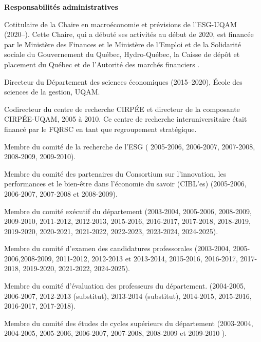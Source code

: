\centerline{\bf Responsabilit\'es administratives}
\begin{description}

\vspace{.3 cm}

\item Cotitulaire de la Chaire en macro\'economie et pr\'evisions de l'ESG-UQAM (2020--). Cette Chaire, qui a d\'ebut\'e ses activit\'es au d\'ebut de 2020, est financ\'ee par le Minist\`ere des Finances et le Minist\`ere de l'Emploi et de la Solidarit\'e sociale du Gouvernement du Qu\'ebec, Hydro-Qu\'ebec, la Caisse de d\'ep\^ot et placement du Qu\'ebec et de l'Autorit\'e des march\'es financiers .

\item Directeur du D\'epartement des sciences \'economiques (2015--2020), \'Ecole des sciences de la gestion, UQAM.

\item Codirecteur du centre de recherche CIRP\'EE et directeur de
la composante CIRP\'EE-UQAM, 2005 \`a 2010. Ce centre de recherche interuniversitaire
\'etait financ\'e par le FQRSC en tant que regroupement strat\'egique.


\item Membre du comit\'e de la recherche de l'ESG (
2005-2006, 2006-2007, 2007-2008, 2008-2009, 2009-2010).

\item Membre du comit\'e des partenaires du Consortium sur l'innovation,
les performances et le bien-\^etre dans l'\'economie du savoir
(CIBL'es) (2005-2006, 2006-2007, 2007-2008 et 2008-2009).

\item Membre du comit\'e ex\'ecutif du d\'epartement (2003-2004, 2005-2006, 2008-2009, 2009-2010, 2011-2012, 2012-2013, 2015-2016, 2016-2017, 2017-2018, 2018-2019, 2019-2020, 2020-2021, 2021-2022, 2022-2023, 2023-2024, 2024-2025).

\item Membre du comit\'e d'examen des candidatures professorales (2003-2004, 2005-2006,2008-2009, 2011-2012, 2012-2013 et 2013-2014, 2015-2016, 2016-2017, 2017-2018, 2019-2020, 2021-2022, 2024-2025).

\item Membre du comit\'e d'\'evaluation des professeurs du
d\'epartement. (2004-2005, 2006-2007, 2012-2013 (substitut), 2013-2014 (substitut), 2014-2015, 2015-2016, 2016-2017, 2017-2018).

\item Membre du comit\'e des \'etudes de cycles sup\'erieurs du d\'epartement (2003-2004, 2004-2005, 2005-2006, 2006-2007, 2007-2008, 2008-2009 et 2009-2010 ).


\end{description}
